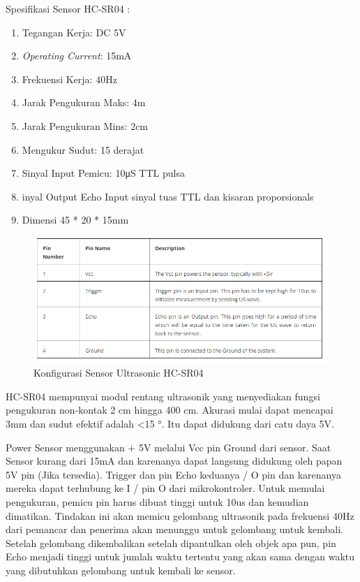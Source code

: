 \begin{enumerate}
Spesifikasi Sensor HC-SR04 :
\begin{enumerate}
    \item Tegangan Kerja: DC 5V
    \item \textit{Operating Current}: 15mA
    \item Frekuensi Kerja: 40Hz
    \item Jarak Pengukuran Maks: 4m
    \item Jarak Pengukuran Mins: 2cm
    \item Mengukur Sudut: 15 derajat
    \item Sinyal Input Pemicu: 10μS TTL pulsa
    \item inyal Output Echo Input sinyal tuas TTL dan kisaran proporsionals
    \item Dimensi 45 * 20 * 15mm
\end{enumerate}

\begin{figure}[H]
\centering
\includegraphics[width=1\textwidth]{figures/konfig.png}
\caption{Konfigurasi Sensor Ultrasonic HC-SR04}
\label{print}
\end{figure}

\par HC-SR04 mempunyai  modul rentang ultrasonik yang menyediakan fungsi pengukuran non-kontak 2 cm hingga 400 cm. Akurasi mulai dapat mencapai 3mm dan sudut efektif adalah <15 °. Itu dapat didukung dari catu daya 5V.

\par Power Sensor menggunakan + 5V melalui Vcc pin Ground dari sensor. Saat Sensor kurang dari 15mA dan karenanya dapat langsung didukung oleh papan 5V pin (Jika tersedia). Trigger dan pin Echo keduanya / O pin dan karenanya mereka dapat terhubung ke I / pin O dari mikrokontroler. Untuk memulai pengukuran, pemicu pin harus dibuat tinggi untuk 10us dan kemudian dimatikan. Tindakan ini akan memicu gelombang ultrasonik pada frekuensi 40Hz dari pemancar dan penerima akan menunggu untuk gelombang untuk kembali. Setelah gelombang dikembalikan setelah dipantulkan oleh objek apa pun, pin Echo menjadi tinggi untuk jumlah waktu tertentu yang akan sama dengan waktu yang dibutuhkan gelombang untuk kembali ke sensor.



\end{enumerate}
